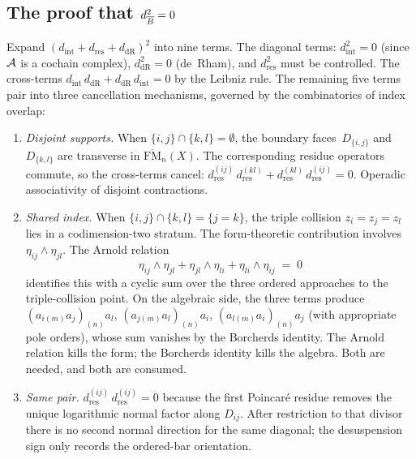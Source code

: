\subsection*{The proof that $d_{\overline{B}}^2=0$}

Expand $(d_{\mathrm{int}}+d_{\mathrm{res}}+d_{\mathrm{dR}})^2$
into nine terms. The diagonal terms: $d_{\mathrm{int}}^2=0$
(since~$\mathcal{A}$ is a cochain complex), $d_{\mathrm{dR}}^2=0$
(de~Rham), and $d_{\mathrm{res}}^2$ must be controlled. The
cross-terms $d_{\mathrm{int}}\,d_{\mathrm{dR}}+
d_{\mathrm{dR}}\,d_{\mathrm{int}}=0$ by
the Leibniz rule. The remaining five terms pair into three
cancellation mechanisms, governed by the combinatorics of index
overlap:
\begin{enumerate}[label=(\alph*)]
\item \emph{Disjoint supports.}\; When $\{i,j\}\cap\{k,l\}
=\emptyset$, the boundary faces~$D_{\{i,j\}}$
and~$D_{\{k,l\}}$ are transverse in
$\overline{\mathrm{FM}}_n(X)$. The corresponding residue
operators commute, so the cross-terms cancel:
$d_{\mathrm{res}}^{(ij)}\,d_{\mathrm{res}}^{(kl)}
+d_{\mathrm{res}}^{(kl)}\,d_{\mathrm{res}}^{(ij)}=0$.
Operadic associativity of disjoint contractions.
\item \emph{Shared index.}\; When
$\{i,j\}\cap\{k,l\}=\{j=k\}$, the triple collision
$z_i=z_j=z_l$ lies in a codimension-two stratum. The
form-theoretic contribution involves
$\eta_{ij}\wedge\eta_{jl}$. The Arnold relation
\[
\eta_{ij}\wedge\eta_{jl}
+\eta_{jl}\wedge\eta_{li}
+\eta_{li}\wedge\eta_{ij}
\;=\;0
\]
identifies this with a cyclic sum over the three ordered
approaches to the triple-collision point. On the algebraic
side, the three terms produce
$(a_{i(m)}a_j)_{(n)}a_l$, $(a_{j(m)}a_l)_{(n)}a_i$,
$(a_{l(m)}a_i)_{(n)}a_j$ (with appropriate pole orders),
whose sum vanishes by the Borcherds identity. The Arnold relation kills the form; the Borcherds identity
kills the algebra. Both are needed, and both are consumed.
\item \emph{Same pair.}\;
$d_{\mathrm{res}}^{(ij)}\,d_{\mathrm{res}}^{(ij)}=0$ because the first
Poincar\'e residue removes the unique logarithmic normal factor along
\(D_{ij}\).  After restriction to that divisor there is no second normal
direction for the same diagonal; the desuspension sign only records the
ordered-bar orientation.
\end{enumerate}

